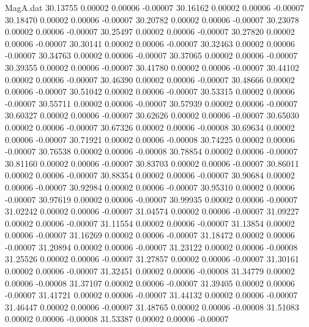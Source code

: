 \begin{filecontents}{MagA.dat}
  30.13755    0.00002    0.00006   -0.00007
  30.16162    0.00002    0.00006   -0.00007
  30.18470    0.00002    0.00006   -0.00007
  30.20782    0.00002    0.00006   -0.00007
  30.23078    0.00002    0.00006   -0.00007
  30.25497    0.00002    0.00006   -0.00007
  30.27820    0.00002    0.00006   -0.00007
  30.30141    0.00002    0.00006   -0.00007
  30.32463    0.00002    0.00006   -0.00007
  30.34763    0.00002    0.00006   -0.00007
  30.37065    0.00002    0.00006   -0.00007
  30.39355    0.00002    0.00006   -0.00007
  30.41780    0.00002    0.00006   -0.00007
  30.44102    0.00002    0.00006   -0.00007
  30.46390    0.00002    0.00006   -0.00007
  30.48666    0.00002    0.00006   -0.00007
  30.51042    0.00002    0.00006   -0.00007
  30.53315    0.00002    0.00006   -0.00007
  30.55711    0.00002    0.00006   -0.00007
  30.57939    0.00002    0.00006   -0.00007
  30.60327    0.00002    0.00006   -0.00007
  30.62626    0.00002    0.00006   -0.00007
  30.65030    0.00002    0.00006   -0.00007
  30.67326    0.00002    0.00006   -0.00008
  30.69634    0.00002    0.00006   -0.00007
  30.71921    0.00002    0.00006   -0.00008
  30.74225    0.00002    0.00006   -0.00007
  30.76538    0.00002    0.00006   -0.00008
  30.78854    0.00002    0.00006   -0.00007
  30.81160    0.00002    0.00006   -0.00007
  30.83703    0.00002    0.00006   -0.00007
  30.86011    0.00002    0.00006   -0.00007
  30.88354    0.00002    0.00006   -0.00007
  30.90684    0.00002    0.00006   -0.00007
  30.92984    0.00002    0.00006   -0.00007
  30.95310    0.00002    0.00006   -0.00007
  30.97619    0.00002    0.00006   -0.00007
  30.99935    0.00002    0.00006   -0.00007
  31.02242    0.00002    0.00006   -0.00007
  31.04574    0.00002    0.00006   -0.00007
  31.09227    0.00002    0.00006   -0.00007
  31.11554    0.00002    0.00006   -0.00007
  31.13854    0.00002    0.00006   -0.00007
  31.16269    0.00002    0.00006   -0.00007
  31.18472    0.00002    0.00006   -0.00007
  31.20894    0.00002    0.00006   -0.00007
  31.23122    0.00002    0.00006   -0.00008
  31.25526    0.00002    0.00006   -0.00007
  31.27857    0.00002    0.00006   -0.00007
  31.30161    0.00002    0.00006   -0.00007
  31.32451    0.00002    0.00006   -0.00008
  31.34779    0.00002    0.00006   -0.00008
  31.37107    0.00002    0.00006   -0.00007
  31.39405    0.00002    0.00006   -0.00007
  31.41721    0.00002    0.00006   -0.00007
  31.44132    0.00002    0.00006   -0.00007
  31.46447    0.00002    0.00006   -0.00007
  31.48765    0.00002    0.00006   -0.00008
  31.51083    0.00002    0.00006   -0.00008
  31.53387    0.00002    0.00006   -0.00007

\end{filecontents}
